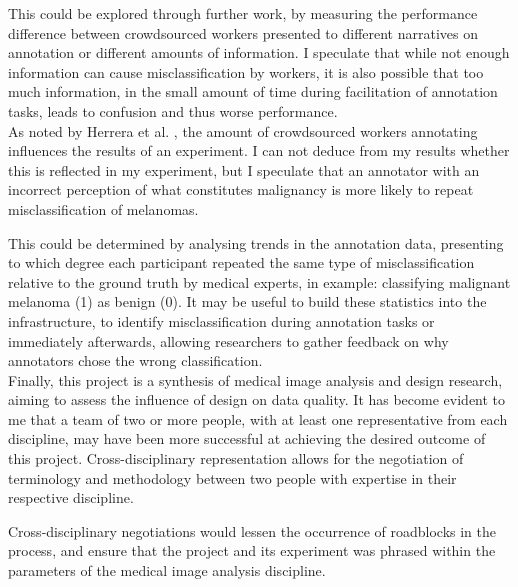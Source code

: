 \documentclass[../report.tex]{subfiles}
\begin{document}
This could be explored through further work, by measuring the performance difference between crowdsourced workers presented to different narratives on annotation or different amounts of information. I speculate that while not enough information can cause misclassification by workers, it is also possible that too much information, in the small amount of time during facilitation of annotation tasks, leads to confusion and thus worse performance. \\

As noted by Herrera et al. \cite{herrera2014crowd}, the amount of crowdsourced workers annotating influences the results of an experiment. I can not deduce from my results whether this is reflected in my experiment, but I speculate that an annotator with an incorrect perception of what constitutes malignancy is more likely to repeat misclassification of melanomas.

This could be determined by analysing trends in the annotation data, presenting to which degree each participant repeated the same type of misclassification relative to the ground truth by medical experts, in example: classifying malignant melanoma (1) as benign (0). It may be useful to build these statistics into the infrastructure, to identify misclassification during annotation tasks or immediately afterwards, allowing researchers to gather feedback on why annotators chose the wrong classification. \\

Finally, this project is a synthesis of medical image analysis and design research, aiming to assess the influence of design on data quality. It has become evident to me that a team of two or more people, with at least one representative from each discipline, may have been more successful at achieving the desired outcome of this project. Cross-disciplinary representation allows for the negotiation of terminology and methodology between two people with expertise in their respective discipline.

Cross-disciplinary negotiations would lessen the occurrence of roadblocks in the process, and ensure that the project and its experiment was phrased within the parameters of the medical image analysis discipline.
\end{document}
